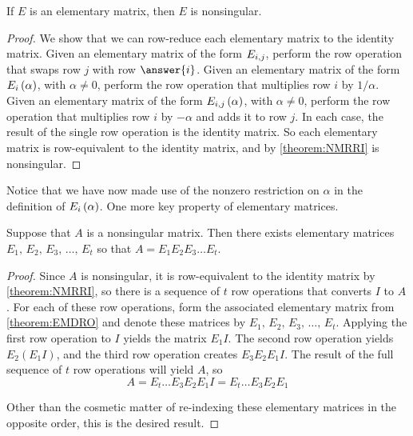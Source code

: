 \documentclass{ximera}
\begin{document}
\begin{theorem}
  \label{theorem:EMN}

  If $E$ is an elementary matrix, then $E$ is nonsingular.

  \begin{proof}
    We show that we can row-reduce each elementary matrix to the
    identity matrix.  Given an elementary matrix of the form
    $E_{i,j}$, perform the row operation that swaps row $j$
    with row $\answer{i}$.  Given an elementary matrix of the form
    $E_{i}\left(\alpha\right)$, with $\alpha\neq 0$, perform the row
    operation that multiplies row $i$ by $1/\alpha$.  Given an
    elementary matrix of the form $E_{i,j}\left(\alpha\right)$, with
    $\alpha\neq 0$, perform the row operation that multiplies row $i$
    by $-\alpha$ and adds it to row $j$.  In each case, the result of
    the single row operation is the identity matrix.  So each
    elementary matrix is row-equivalent to the identity matrix, and by
    \ref{theorem:NMRRI} is nonsingular.
\end{proof}
\end{theorem}

Notice that we have now made use of the nonzero restriction on
$\alpha$ in the definition of $E_{i}\left(\alpha\right)$.  One more key
property of elementary matrices.

\begin{theorem}
\label{theorem:NMPEM}

Suppose that $A$ is a nonsingular matrix.  Then there exists
elementary matrices $E_1,\,E_2,\,E_3,\,\dots,\,E_t$ so that
$A=E_1 E_2 E_3\dots E_t$.

\begin{proof}
  Since $A$ is nonsingular, it is row-equivalent to the identity
  matrix by \ref{theorem:NMRRI}, so there is a sequence of $t$ row
  operations that converts $I$ to $A$.  For each of these row
  operations, form the associated elementary matrix from
  \ref{theorem:EMDRO} and denote these matrices by
  $E_1,\,E_2,\,E_3,\,\dots,\,E_t$.  Applying the first row operation
  to $I$ yields the matrix $E_1I$.  The second row operation yields
  $E_2(E_1I)$, and the third row operation creates $E_3E_2E_1I$.  The
  result of the full sequence of $t$ row operations will yield $A$, so
  \[
    A=  E_t\dots E_3E_2E_1I= E_t\dots E_3E_2E_1
  \]

  Other than the cosmetic matter of re-indexing these elementary
  matrices in the opposite order, this is the desired result.
\end{proof}
\end{theorem}
\end{document}
